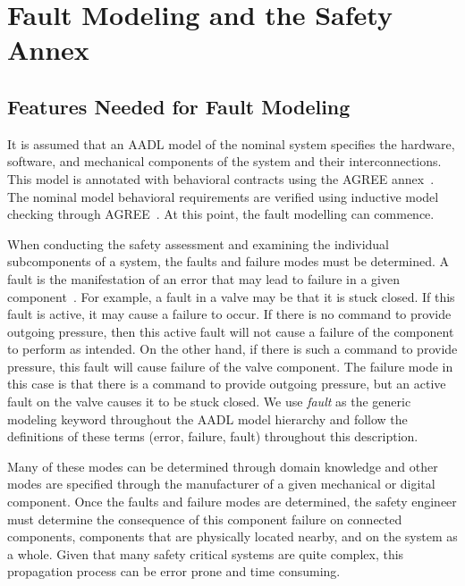 \section{Fault Modeling and the Safety Annex}
\label{sec:fault_modeling}


\subsection{Features Needed for Fault Modeling}
It is assumed that an AADL model of the nominal system specifies the hardware, software, and mechanical components of the system and their interconnections. This model is annotated with behavioral contracts using the AGREE annex~\cite{NFM2012:CoGaMiWhLaLu}. The nominal model behavioral requirements are verified using inductive model checking through AGREE~\cite{2017arXiv171201222G}. At this point, the fault modelling can commence. 

When conducting the safety assessment and examining the individual subcomponents of a system, the faults and failure modes must be determined. A fault is the manifestation of an error that may lead to failure in a given component~\cite{SAE:ARP4754A}. For example, a fault in a valve may be that it is stuck closed. If this fault is active, it may cause a failure to occur. If there is no command to provide outgoing pressure, then this active fault will not cause a failure of the component to perform as intended. On the other hand, if there is such a command to provide pressure, this fault will cause failure of the valve component. The failure mode in this case is that there is a command to provide outgoing pressure, but an active fault on the valve causes it to be stuck closed. We use {\em fault} as the generic modeling keyword throughout the AADL model hierarchy and follow the definitions of these terms (error, failure, fault) throughout this description.

Many of these modes can be determined through domain knowledge and other modes are specified through the manufacturer of a given mechanical or digital component. Once the faults and failure modes are determined, the safety engineer must determine the consequence of this component failure on connected components, components that are physically located nearby, and on the system as a whole. Given that many safety critical systems are quite complex, this propagation process can be error prone and time consuming.

